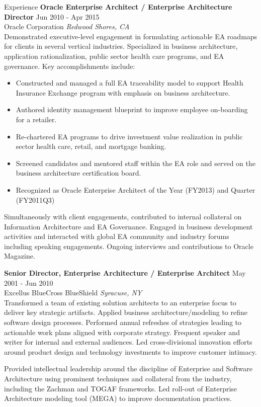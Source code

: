 \documentclass{resume} %
\begin{document}
\begin{rSection}{Experience}
\textbf{Oracle Enterprise Architect / Enterprise Architecture Director} \hfill Jun 2010 - Apr 2015\\
Oracle Corporation \hfill \textit{Redwood Shores, CA}\\
Demonstrated executive-level engagement in formulating actionable EA roadmaps for clients in several vertical industries. Specialized in business architecture, application rationalization, public sector health care programs, and EA governance. Key accomplishments include:
\begin{itemize}
\itemsep -3pt {}
\item Constructed and managed a full EA traceability model to support Health Insurance Exchange program with emphasis on business architecture.
\item Authored identity management blueprint to improve employee on-boarding for a retailer.
\item Re-chartered EA programs to drive investment value realization in public sector health care, retail, and mortgage banking.
\item Screened candidates and mentored staff within the EA role and served on the business architecture certification board.
\item Recognized as Oracle Enterprise Architect of the Year (FY2013) and Quarter (FY2011Q3)
\end{itemize}
Simultaneously with client engagements, contributed to internal collateral on Information Architecture and EA Governance. Engaged in business development activities and interacted with global EA community and industry forums including speaking engagements. Ongoing interviews and contributions to Oracle Magazine. 
\end{rSection}

\textbf{Senior Director, Enterprise Architecture / Enterprise Architect} \hfill May 2001 - Jun 2010\\
Excellus BlueCross BlueShield \hfill \textit{Syracuse, NY}\\
Transformed a team of existing solution architects to an enterprise focus to deliver key strategic artifacts. Applied business architecture/modeling to refine software design processes. Performed annual refreshes of strategies leading to actionable work plans aligned with corporate strategy. Frequent speaker and writer for internal and external audiences. Led cross-divisional innovation efforts around product design and technology investments to improve customer intimacy.

Provided intellectual leadership around the discipline of Enterprise and Software Architecture using prominent techniques and collateral from the industry, including the Zachman and TOGAF frameworks. Led roll-out of Enterprise Architecture modeling tool (MEGA) to improve documentation practices.
\end{document}
